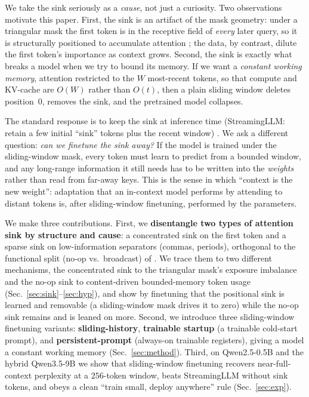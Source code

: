 \documentclass[letterpaper]{article} %
\begin{document}
We take the sink seriously as a \emph{cause}, not just a curiosity. Two observations motivate this paper. First, the sink is an artifact of the mask geometry: under a triangular mask the first token is in the receptive field of \emph{every} later query, so it is structurally positioned to accumulate attention \citep{wu2025position}; the data, by contrast, dilute the first token's importance as context grows. Second, the sink is exactly what breaks a model when we try to bound its memory. If we want a \emph{constant working memory}, attention restricted to the $W$ most-recent tokens, so that compute and KV-cache are $O(W)$ rather than $O(t)$, then a plain sliding window deletes position~0, removes the sink, and the pretrained model collapses.

The standard response is to keep the sink at inference time (StreamingLLM: retain a few initial ``sink'' tokens plus the recent window) \citep{xiao2024streamingllm}. We ask a different question: \emph{can we finetune the sink away?} If the model is trained under the sliding-window mask, every token must learn to predict from a bounded window, and any long-range information it still needs has to be written into the \emph{weights} rather than read from far-away keys. This is the sense in which ``context is the new weight'': adaptation that an in-context model performs by attending to distant tokens is, after sliding-window finetuning, performed by the parameters.

We make three contributions. First, we \textbf{disentangle two types of attention sink by structure and cause}: a concentrated sink on the first token and a sparse sink on low-information separators (commas, periods), orthogonal to the functional split (no-op vs.\ broadcast) of \citet{fesser2026unifying}. We trace them to two different mechanisms, the concentrated sink to the triangular mask's exposure imbalance and the no-op sink to content-driven bounded-memory token usage (Sec.~\ref{sec:sink}--\ref{sec:hyp}), and show by finetuning that the positional sink is learned and removable (a sliding-window mask drives it to zero) while the no-op sink remains and is leaned on more. Second, we introduce three sliding-window finetuning variants: \textbf{sliding-history}, \textbf{trainable startup} (a trainable cold-start prompt), and \textbf{persistent-prompt} (always-on trainable registers), giving a model a constant working memory (Sec.~\ref{sec:method}). Third, on Qwen2.5-0.5B and the hybrid Qwen3.5-9B we show that sliding-window finetuning recovers near-full-context perplexity at a $256$-token window, beats StreamingLLM without sink tokens, and obeys a clean ``train small, deploy anywhere'' rule (Sec.~\ref{sec:exp}).
\end{document}
